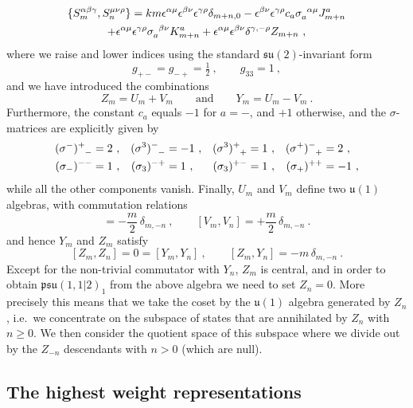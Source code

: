 \documentclass[a4paper,11pt]{article}
\numberwithin{equation}{section}
\def\be{\begin{equation}}
\def\ee{\end{equation}}
\begin{document}
\begin{multline} 
\{S^{\alpha\beta\gamma}_m,S^{\mu\nu\rho}_n\}=km \epsilon^{\alpha\mu}\epsilon^{\beta\nu}\epsilon^{\gamma\rho}\delta_{m+n,0}-\epsilon^{\beta\nu}\epsilon^{\gamma\rho} c_a\tensor{\sigma}{_a^{\alpha\mu}} J^a_{m+n}\\
+\epsilon^{\alpha\mu}\epsilon^{\gamma\rho} \tensor{\sigma}{_a^{\beta\nu}} K^a_{m+n}+\epsilon^{\alpha\mu}\epsilon^{\beta\nu}\delta^{\gamma,-\rho} Z_{m+n}\ , \label{anticomm}
\end{multline}
where we raise and lower indices using the standard $\mathfrak{su}(2)$-invariant form
\be 
g_{+-}=g_{-+}=\tfrac{1}{2}\ , \qquad g_{33}=1\ , 
\ee 
and we have introduced the combinations 
\be 
Z_m=U_m+V_m\qquad\text{and}\qquad Y_m=U_m-V_m\ . 
\ee
Furthermore, the constant $c_a$ equals $-1$ for $a=-$, and $+1$ otherwise, and the $\sigma$-matrices are explicitly given by 
\begin{align}
\tensor{(\sigma^-)}{^+_-}&=2\ , & \tensor{(\sigma^3)}{^-_-}&=-1\ , & \tensor{(\sigma^3)}{^+_+}&=1\ , & \tensor{(\sigma^+)}{^-_+}&=2\ , \\
\tensor{(\sigma_-)}{^{--}}&=1\ , & \tensor{(\sigma_3)}{^{-+}}&=1\ , & \tensor{(\sigma_3)}{^{+-}}&=1\ , & \tensor{(\sigma_+)}{^{++}}&=-1\ ,
\end{align}
while all the other components vanish. Finally, $U_m$ and $V_m$ define two $\mathfrak{u}(1)$ algebras, with commutation relations 
\be
[U_m,U_n]  = - \frac{m}{2} \, \delta_{m,-n}  \ , \qquad 
[V_m,V_n]  = + \frac{m}{2} \, \delta_{m,-n}  \ . 
\ee
and hence $Y_m$ and $Z_m$ satisfy
\be\label{ZZ}
[Z_m,Z_n] = 0  = [Y_m,Y_n] \ ,  \qquad [Z_m,Y_n] = - m \, \delta_{m,-n} \ . 
\ee
Except for the non-trivial commutator with $Y_n$, $Z_m$ is central, and in order to obtain 
$\mathfrak{psu}(1,1|2)_1$ from the above algebra we need to set $Z_n=0$. More precisely this means that we take the coset by the $\mathfrak{u}(1)$ algebra generated by $Z_n$, i.e.\ we concentrate on the subspace of states that are annihilated by $Z_n$ with $n\geq 0$. We then consider the quotient space of this subspace where we divide out by the $Z_{-n}$ descendants with $n>0$ (which are null). 


\subsection{The highest weight representations} 
\end{document}
